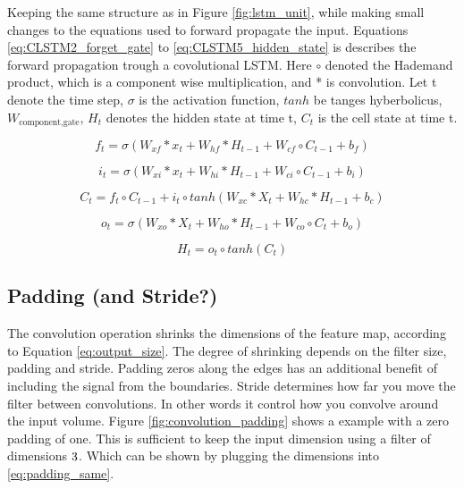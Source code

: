 \documentclass{article}
\begin{document}
Keeping the same structure as in Figure \ref{fig:lstm_unit}, while making small changes to the equations used to forward propagate the input. Equations \eqref{eq:CLSTM2_forget_gate} to \eqref{eq:CLSTM5_hidden_state} is describes the forward propagation trough a covolutional LSTM. Here $\circ$ denoted the Hademand product, which is a component wise multiplication, and * is convolution. 
Let t denote the time step, $\sigma$ is the activation function, $tanh$ be tanges hyberbolicus, $W_{\text{component}, \text{gate}}$, $H_{t}$ denotes the hidden state at time t, $C_{t}$ is the cell state at time t. 

\begin{equation} \label{eq:CLSTM2_forget_gate}
        f_t = \sigma \left( W_{xf}*x_t + W_{hf}*H_{t-1} + W_{cf}\circ C_{t-1}+b_f \right)
\end{equation}

\begin{equation} \label{eq:CLSTM1_input_gate}
    i_t = \sigma \left( W_{xi}*x_t + W_{hi}*H_{t-1} + W_{ci}\circ C_{t-1}+b_i \right) 
\end{equation}

\begin{equation} \label{eq:CLSTM3_cellstate}
        C_t = f_t \circ C_{t-1} +i_t\circ tanh\left( W_{xc}*X_t + W_{hc}*H_{t-1} + b_c \right)
\end{equation}

\begin{equation} \label{eq:CLSTM4_output_gate}
        o_t = \sigma \left( W_{xo}*X_t + W_{ho}*H_{t-1} + W_{co}\circ C_{t}+b_o \right)
\end{equation}

\begin{equation} \label{eq:CLSTM5_hidden_state}
        H_t = o_t \circ tanh \left( C_t \right)
\end{equation}

\subsection{Padding (and Stride?)} \label{sec:padding}
The convolution operation shrinks the dimensions of the feature map, according to Equation \eqref{eq:output_size}. The degree of shrinking  depends on the  filter size, padding and stride. Padding zeros along the edges has an additional benefit of including the signal from the boundaries. Stride determines how far you move the filter between convolutions. In other words it control how you convolve around the input volume. Figure \ref{fig:convolution_padding} shows a example with a zero padding of one. This is sufficient to keep the input dimension using a filter of dimensions $3 \time 3$. Which can be shown by plugging the dimensions into \eqref{eq:padding_same}.
\end{document}
